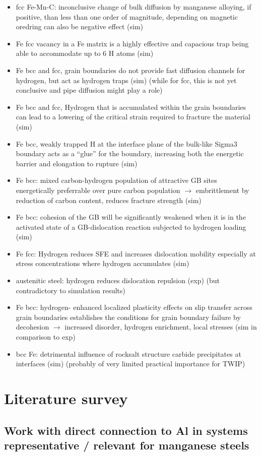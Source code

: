 \documentclass[11pt,floatfix,showpacs]{amsart}
\newcommand{\se}{\section}
\newcommand{\sse}{\subsection}
\begin{document}
\begin{itemize}
\item fcc Fe-Mn-C: inconclusive change of bulk diffusion by manganese alloying, if positive, than less than one order of magnitude, depending on magnetic oredring can also be negative effect (sim)
\item Fe fcc vacancy in a Fe matrix is a highly effective and capacious trap being able to accommodate up to 6 H atoms (sim)
\item Fe bcc and fcc, grain boundaries do not provide fast diffusion channels for hydrogen, but act as hydrogen traps (sim) (while for fcc, this is not yet conclusive and pipe diffusion might play a role)
\item Fe bcc and fcc, Hydrogen that is accumulated within the grain boundaries can lead to a lowering of the critical strain required to fracture the material (sim)
\item Fe bcc, weakly trapped H at the interface plane of the bulk-like Sigma3 boundary acts as a “glue” for the boundary, increasing both the energetic barrier and elongation to rupture (sim)
\item Fe bcc: mixed carbon-hydrogen population of attractive GB sites energetically preferrable over pure carbon population $\to$ embrittlement by reduction of carbon content, reduces fracture strength (sim)
\item Fe bcc: cohesion of the GB will be significantly weakened when it is in the activated state of a GB-dislocation reaction subjected to hydrogen loading (sim)
\item Fe fcc: Hydrogen reduces SFE and increases dislocation mobility especially at stress concentrations where hydrogen accumulates (sim)
\item austenitic steel: hydrogen reduces dislocation repulsion (exp) (but contradictory to simulation results)
\item Fe bcc: hydrogen- enhanced localized plasticity effects on slip transfer across grain boundaries establishes the conditions for grain boundary failure by decohesion $\to$ increased disorder, hydrogen enrichment, local stresses (sim in comparison to exp)
\item bcc Fe: detrimental influence of rocksalt structure carbide precipitates at interfaces (sim) (probably of very limited practical importance for TWIP)
\end{itemize}



 
\se{Literature survey}
\sse{Work with direct connection to Al in systems representative / relevant for manganese steels}
\end{document}
